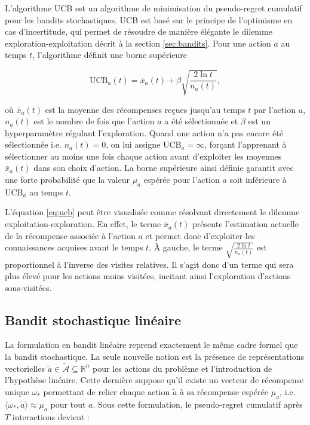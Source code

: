 L'algorithme UCB \citep{ucb} est un algorithme de minimisation du pseudo-regret cumulatif pour les
bandits stochastiques.
UCB est basé sur le principe de l'optimisme en cas d'incertitude, qui permet de
résoudre de manière élégante le dilemme exploration-exploitation décrit à la section \ref{sec:bandits}.
Pour une action $a$ au temps $t$, l'algorithme définit une borne supérieure

\begin{equation}
    \text{UCB}_a(t) = \bar{x}_a(t) + \beta \sqrt{\frac{2\ln t}{n_a(t)}},
    \label{eq:ucb}
\end{equation}

où $\bar{x}_a(t)$ est la moyenne des récompenses reçues jusqu'au temps $t$ par l'action $a$,
$n_a(t)$ est le nombre de fois que l'action $a$ a été sélectionnée et $\beta$ est un
hyperparamètre régulant l'exploration.
Quand une action n'a pas encore été sélectionnée i.e. $n_a(t)=0$, on 
lui assigne UCB$_a = \infty$, forçant l'apprenant à sélectionner au moins 
une fois chaque action avant d'exploiter les moyennes $\bar{x}_a(t)$
dans son choix d'action.
La borne supérieure ainsi définie garantit avec une forte probabilité que la valeur $\mu_a$ espérée
pour l'action $a$ soit inférieure à UCB$_a$ au temps $t$.

L'équation \eqref{eq:ucb} peut être visualisée comme résolvant directement le dilemme
exploitation-exploration.
En effet, le terme $\bar{x}_a(t)$ présente l'estimation actuelle de la récompense
associée à l'action $a$ et permet donc d'exploiter les connaissances acquises
avant le temps $t$.
À gauche, le terme $\sqrt{\frac{2 \ln t}{n_a(t)}}$ est proportionnel à l'inverse
des visites relatives.
Il s'agit donc d'un terme qui sera plus élevé pour les actions moins visitées,
incitant ainsi l'exploration d'actions sous-visitées.

\subsection{Bandit stochastique linéaire}
\label{subsec:bandit_lineaire}

La formulation en bandit linéaire reprend exactement le même
cadre formel que la bandit stochastique.
La seule nouvelle notion est la présence de représentations vectorielles
$\tilde{a} \in \tilde{\mathcal{A}} \subseteq \mathbb{R}^n$
pour les actions du problème et l'introduction de l'hypothèse linéaire.
Cette dernière suppose qu'il existe un vecteur de récompense unique $\omega_*$
permettant de relier chaque action $\tilde{a}$ à sa récompense espérée $\mu_a$, i.e. 
$\langle \omega_*, \tilde{a}\rangle \approx \mu_a$ pour tout $a$.
Sous cette formulation, le pseudo-regret cumulatif après $T$ interactions
devient :

